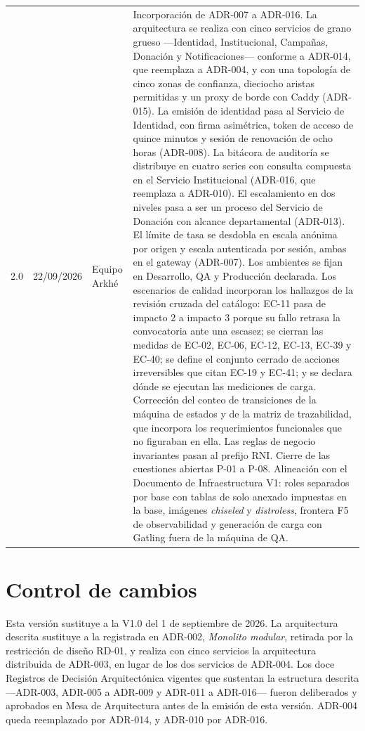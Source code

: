 \documentclass[11pt,a4paper]{article}
\begin{document}
\begin{longtable}{L{1.5cm} L{1.9cm} L{2.4cm} L{8.0cm}}
2.0 & 22/09/2026 & Equipo Arkhé & Incorporación de ADR-007 a ADR-016. La arquitectura se realiza con cinco servicios de grano grueso ---Identidad, Institucional, Campañas, Donación y Notificaciones--- conforme a ADR-014, que reemplaza a ADR-004, y con una topología de cinco zonas de confianza, dieciocho aristas permitidas y un proxy de borde con Caddy (ADR-015). La emisión de identidad pasa al Servicio de Identidad, con firma asimétrica, token de acceso de quince minutos y sesión de renovación de ocho horas (ADR-008). La bitácora de auditoría se distribuye en cuatro series con consulta compuesta en el Servicio Institucional (ADR-016, que reemplaza a ADR-010). El escalamiento en dos niveles pasa a ser un proceso del Servicio de Donación con alcance departamental (ADR-013). El límite de tasa se desdobla en escala anónima por origen y escala autenticada por sesión, ambas en el gateway (ADR-007). Los ambientes se fijan en Desarrollo, QA y Producción declarada. Los escenarios de calidad incorporan los hallazgos de la revisión cruzada del catálogo: EC-11 pasa de impacto 2 a impacto 3 porque su fallo retrasa la convocatoria ante una escasez; se cierran las medidas de EC-02, EC-06, EC-12, EC-13, EC-39 y EC-40; se define el conjunto cerrado de acciones irreversibles que citan EC-19 y EC-41; y se declara dónde se ejecutan las mediciones de carga. Corrección del conteo de transiciones de la máquina de estados y de la matriz de trazabilidad, que incorpora los requerimientos funcionales que no figuraban en ella. Las reglas de negocio invariantes pasan al prefijo RNI. Cierre de las cuestiones abiertas P-01 a P-08. Alineación con el Documento de Infraestructura V1: roles separados por base con tablas de solo anexado impuestas en la base, imágenes \emph{chiseled} y \emph{distroless}, frontera F5 de observabilidad y generación de carga con Gatling fuera de la máquina de QA. \\
\end{longtable}

\vspace{0.3cm}

\section*{Control de cambios}

\noindent Esta versión sustituye a la V1.0 del 1 de septiembre de 2026. La arquitectura descrita sustituye a la registrada en ADR-002, \emph{Monolito modular}, retirada por la restricción de diseño RD-01, y realiza con cinco servicios la arquitectura distribuida de ADR-003, en lugar de los dos servicios de ADR-004. Los doce Registros de Decisión Arquitectónica vigentes que sustentan la estructura descrita ---ADR-003, ADR-005 a ADR-009 y ADR-011 a ADR-016--- fueron deliberados y aprobados en Mesa de Arquitectura antes de la emisión de esta versión. ADR-004 queda reemplazado por ADR-014, y ADR-010 por ADR-016.
\end{document}
